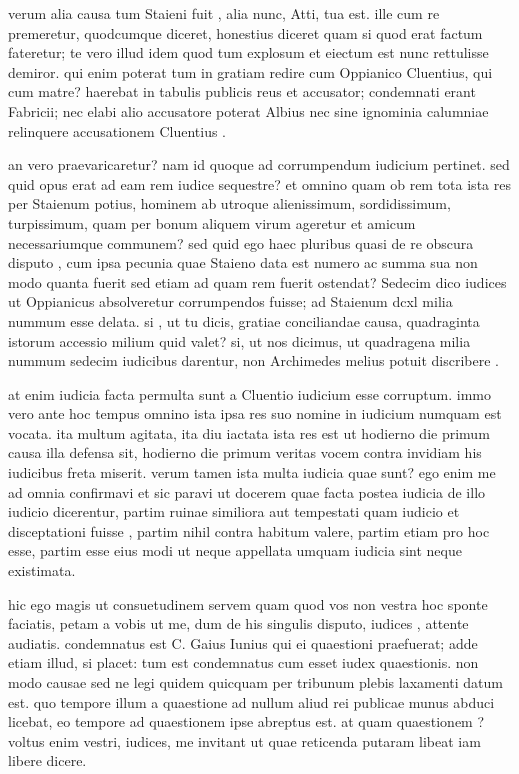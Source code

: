  verum alia causa tum Staieni fuit , alia nunc, Atti, tua est. ille cum re premeretur, quodcumque diceret, honestius diceret quam si quod erat factum fateretur; te vero illud idem quod tum explosum et eiectum est nunc rettulisse demiror. qui enim poterat tum in gratiam redire cum Oppianico Cluentius, qui cum matre? haerebat in tabulis publicis reus et accusator; condemnati erant Fabricii; nec elabi alio accusatore poterat Albius nec sine ignominia calumniae relinquere accusationem Cluentius .

 an vero praevaricaretur? nam id quoque ad corrumpendum iudicium pertinet. sed quid opus erat ad eam rem iudice sequestre? et omnino quam ob rem tota ista res per Staienum potius, hominem ab utroque alienissimum, sordidissimum, turpissimum, quam per bonum aliquem virum ageretur et amicum necessariumque communem? sed quid ego haec pluribus quasi de re obscura disputo , cum ipsa pecunia quae Staieno data est numero ac summa sua non modo quanta fuerit sed etiam ad quam rem fuerit ostendat? Sedecim dico iudices ut Oppianicus absolveretur corrumpendos fuisse; ad Staienum dcxl milia nummum esse delata. si , ut tu dicis, gratiae conciliandae causa, quadraginta istorum accessio milium quid valet? si, ut nos dicimus, ut quadragena milia nummum sedecim iudicibus darentur, non Archimedes melius potuit discribere .

 at enim iudicia facta permulta sunt a Cluentio iudicium esse corruptum. immo vero ante hoc tempus omnino ista ipsa res suo nomine in iudicium numquam est vocata. ita multum agitata, ita diu iactata ista res est ut hodierno die primum causa illa defensa sit, hodierno die primum veritas vocem contra invidiam his iudicibus freta miserit. verum tamen ista multa iudicia quae sunt? ego enim me ad omnia confirmavi et sic paravi ut docerem quae facta postea iudicia de illo iudicio dicerentur, partim ruinae similiora aut tempestati quam iudicio et disceptationi fuisse , partim nihil contra habitum valere, partim etiam pro hoc esse, partim esse eius modi ut neque appellata umquam iudicia sint neque existimata.

 hic ego magis ut consuetudinem servem quam quod vos non vestra hoc sponte faciatis, petam a vobis ut me, dum de his singulis disputo, iudices , attente audiatis. condemnatus est C. Gaius Iunius qui ei quaestioni praefuerat; adde etiam illud, si placet: tum est condemnatus cum esset iudex quaestionis. non modo causae sed ne legi quidem quicquam per tribunum plebis laxamenti datum est. quo tempore illum a quaestione ad nullum aliud rei publicae munus abduci licebat, eo tempore ad quaestionem ipse abreptus est. at quam quaestionem ? voltus enim vestri, iudices, me invitant ut quae reticenda putaram libeat iam libere dicere.

